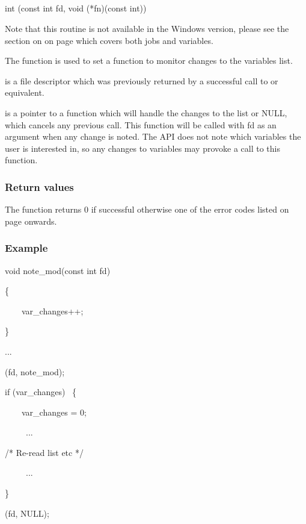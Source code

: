 \subsection{\funcnameXBvarmon{}}

\begin{expara}

int \funcnameXBvarmon{}(const int fd, void (*fn)(const int))

\end{expara}

Note that this routine is not available in the Windows version, please
see the section on \funcXBsetmon{} on page
\pageref{bkm:xbsetmon} which covers both jobs and variables.

The function \funcXBvarmon{} is used to set a function
to monitor changes to the variables list.

 is a file descriptor which was previously
returned by a successful call to \funcXBopen{} or equivalent.

 is a pointer to a function which will handle
the changes to the list or NULL, which cancels any previous call. This
function will be called with fd as an argument when any change is
noted. The API does not note which variables the user is interested in,
so any changes to variables may provoke a call to this function.

\subsubsection{Return values}
The function returns 0 if successful otherwise one of the error codes
listed on page \pageref{errorcodes} onwards.

\subsubsection{Example}

\begin{expara}

void note\_mod(const int fd)

\{

\ \ \ \ var\_changes++;

\}

\bigskip


...

\bigskip


\funcnameXBvarmon{}(fd, note\_mod);

if (var\_changes) \ \{

\ \ \ \ var\_changes = 0;

\ \ \ \ \ ...

/* Re-read list etc */

\ \ \ \ \ ...

\}

\bigskip


\funcnameXBvarmon{}(fd, NULL);

\end{expara}

